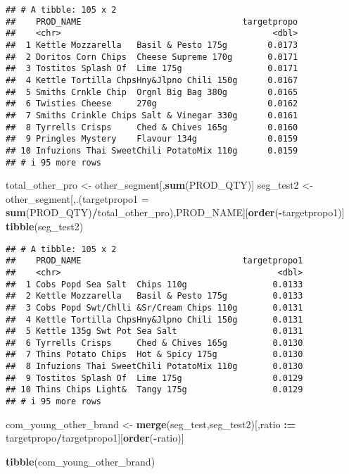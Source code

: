 \documentclass[
]{article}
\newenvironment{Shaded}{\begin{snugshade}}{\end{snugshade}}
\newcommand{\AttributeTok}[1]{\textcolor[rgb]{0.13,0.29,0.53}{#1}}
\newcommand{\FunctionTok}[1]{\textcolor[rgb]{0.13,0.29,0.53}{\textbf{#1}}}
\newcommand{\NormalTok}[1]{#1}
\newcommand{\OtherTok}[1]{\textcolor[rgb]{0.56,0.35,0.01}{#1}}
\newcommand{\SpecialCharTok}[1]{\textcolor[rgb]{0.81,0.36,0.00}{\textbf{#1}}}
\begin{document}
\begin{verbatim}
## # A tibble: 105 x 2
##    PROD_NAME                                targetpropo
##    <chr>                                          <dbl>
##  1 Kettle Mozzarella   Basil & Pesto 175g        0.0173
##  2 Doritos Corn Chips  Cheese Supreme 170g       0.0171
##  3 Tostitos Splash Of  Lime 175g                 0.0171
##  4 Kettle Tortilla ChpsHny&Jlpno Chili 150g      0.0167
##  5 Smiths Crnkle Chip  Orgnl Big Bag 380g        0.0165
##  6 Twisties Cheese     270g                      0.0162
##  7 Smiths Crinkle Chips Salt & Vinegar 330g      0.0161
##  8 Tyrrells Crisps     Ched & Chives 165g        0.0160
##  9 Pringles Mystery    Flavour 134g              0.0159
## 10 Infuzions Thai SweetChili PotatoMix 110g      0.0159
## # i 95 more rows
\end{verbatim}

\begin{Shaded}
\begin{Highlighting}[]
\NormalTok{total\_other\_pro }\OtherTok{\textless{}{-}}\NormalTok{ other\_segment[,}\FunctionTok{sum}\NormalTok{(PROD\_QTY)]}
\NormalTok{seg\_test2 }\OtherTok{\textless{}{-}}\NormalTok{ other\_segment[,.(}\AttributeTok{targetpropo1 =} \FunctionTok{sum}\NormalTok{(PROD\_QTY)}\SpecialCharTok{/}\NormalTok{total\_other\_pro),PROD\_NAME][}\FunctionTok{order}\NormalTok{(}\SpecialCharTok{{-}}\NormalTok{targetpropo1)]}
\FunctionTok{tibble}\NormalTok{(seg\_test2)}
\end{Highlighting}
\end{Shaded}

\begin{verbatim}
## # A tibble: 105 x 2
##    PROD_NAME                                targetpropo1
##    <chr>                                           <dbl>
##  1 Cobs Popd Sea Salt  Chips 110g                 0.0133
##  2 Kettle Mozzarella   Basil & Pesto 175g         0.0133
##  3 Cobs Popd Swt/Chlli &Sr/Cream Chips 110g       0.0131
##  4 Kettle Tortilla ChpsHny&Jlpno Chili 150g       0.0131
##  5 Kettle 135g Swt Pot Sea Salt                   0.0131
##  6 Tyrrells Crisps     Ched & Chives 165g         0.0130
##  7 Thins Potato Chips  Hot & Spicy 175g           0.0130
##  8 Infuzions Thai SweetChili PotatoMix 110g       0.0130
##  9 Tostitos Splash Of  Lime 175g                  0.0129
## 10 Thins Chips Light&  Tangy 175g                 0.0129
## # i 95 more rows
\end{verbatim}

\begin{Shaded}
\begin{Highlighting}[]
\NormalTok{com\_young\_other\_brand }\OtherTok{\textless{}{-}} \FunctionTok{merge}\NormalTok{(seg\_test,seg\_test2)[,ratio }\SpecialCharTok{:=}\NormalTok{ targetpropo}\SpecialCharTok{/}\NormalTok{targetpropo1][}\FunctionTok{order}\NormalTok{(}\SpecialCharTok{{-}}\NormalTok{ratio)]}

\FunctionTok{tibble}\NormalTok{(com\_young\_other\_brand)}
\end{Highlighting}
\end{Shaded}
\end{document}
